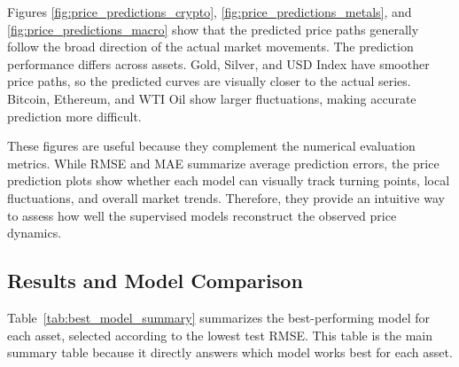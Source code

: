 \documentclass[12pt]{article}
\begin{document}
Figures \ref{fig:price_predictions_crypto}, \ref{fig:price_predictions_metals}, and \ref{fig:price_predictions_macro} show that the predicted price paths generally follow the broad
direction of the actual market movements. The prediction performance differs across assets.
Gold, Silver, and USD Index have smoother price paths, so the predicted curves are visually
closer to the actual series. Bitcoin, Ethereum, and WTI Oil show larger fluctuations, making
accurate prediction more difficult.

These figures are useful because they complement the numerical evaluation metrics.
While RMSE and MAE summarize average prediction errors, the price prediction plots show
whether each model can visually track turning points, local fluctuations, and overall market
trends. Therefore, they provide an intuitive way to assess how well the supervised models
reconstruct the observed price dynamics.


\subsection{Results and Model Comparison}

Table~\ref{tab:best_model_summary} summarizes the best-performing model for each asset, selected according to the lowest test RMSE. This table is the main summary table because it directly answers which model works best for each asset.

\begin{table}[htbp]
\centering
\caption{Best Supervised Model for Each Asset}
\label{tab:best_model_summary}
\end{table}
\end{document}
